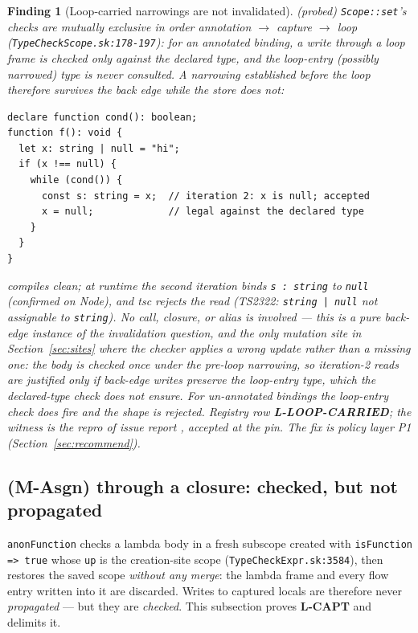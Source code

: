 \documentclass[11pt]{article}
\newtheorem{finding}[theorem]{Finding}
\begin{document}
\begin{finding}[Loop-carried narrowings are not invalidated]
\label{find:loop-carried}
\emph{(probed)} \texttt{Scope::set}'s checks are mutually exclusive in
order annotation $\to$ capture $\to$ loop
(\texttt{TypeCheckScope.sk:178-197}): for an \emph{annotated} binding,
a write through a loop frame is checked only against the declared type,
and the loop-entry (possibly narrowed) type is never consulted. A
narrowing established before the loop therefore survives the back edge
while the store does not:
\begin{verbatim}
declare function cond(): boolean;
function f(): void {
  let x: string | null = "hi";
  if (x !== null) {
    while (cond()) {
      const s: string = x;  // iteration 2: x is null; accepted
      x = null;             // legal against the declared type
    }
  }
}
\end{verbatim}
compiles clean; at runtime the second iteration binds
\texttt{s : string} to \texttt{null} (confirmed on Node), and tsc
rejects the read (TS2322: \texttt{string | null} not assignable to
\texttt{string}). No call, closure, or alias is involved — this is a
pure back-edge instance of the invalidation question, and the only
mutation site in Section~\ref{sec:sites} where the checker applies a
\emph{wrong} update rather than a missing one: the body is checked once
under the pre-loop narrowing, so iteration-2 reads are justified only if
back-edge writes preserve the loop-entry type, which the declared-type
check does not ensure. For \emph{un-annotated} bindings the loop-entry
check does fire and the shape is rejected. Registry row
\textbf{L-LOOP-CARRIED}; the witness is the repro of issue report
, accepted at the pin. The
fix is policy layer P1 (Section~\ref{sec:recommend}).
\end{finding}

\subsection{(M-Asgn) through a closure: checked, but not propagated}
\label{sec:capt-proof}
\texttt{anonFunction} checks a lambda body in a fresh subscope created
with \texttt{isFunction => true} whose \texttt{up} is the creation-site
scope (\texttt{TypeCheckExpr.sk:3584}), then restores the saved scope
\emph{without any merge}: the lambda frame and every flow entry written
into it are discarded. Writes to captured locals are therefore never
\emph{propagated} — but they are \emph{checked}. This subsection proves
\textbf{L-CAPT} and delimits it.
\end{document}
